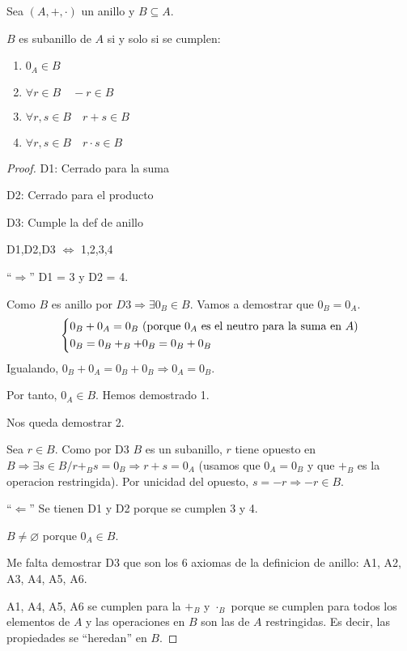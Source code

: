 \begin{proposition}
	Sea \((A,+,\cdot )\) un anillo y \(B \subseteq A \).
	
	\(B \) es subanillo de \(A \) si y solo si se cumplen:
	\begin{enumerate}
		\item \(0_A \in B \)
		\item \(\forall r \in B \quad -r \in B \)
		\item \(\forall r,s \in B \quad r + s \in B \)
		\item \(\forall r,s \in B \quad r \cdot s \in B \)
	\end{enumerate}
\end{proposition}
\begin{proof}
	D1: Cerrado para la suma
	
	D2: Cerrado para el producto
	
	D3: Cumple la def de anillo
	
	D1,D2,D3 \(\iff\) 1,2,3,4
	
	``\(\Rightarrow \)'' D1 = 3 y D2 = 4.
	
	Como \(B \) es anillo por \(D3 \Rightarrow \exists 0_B \in B \). Vamos a demostrar que \(0_B = 0_A \).
	\[
		\begin{dcases}
			0_B + 0_A = 0_B \text{ (porque } 0_A \text{ es el neutro para la suma en } A) \\
			0_B = 0_B +_B + 0_B = 0_B + 0_B
		\end{dcases}
	\]
	Igualando, \(0_B + 0_A = 0_B + 0_B \Rightarrow 0_A = 0_B \).
	
	Por tanto, \(0_A \in B \). Hemos demostrado 1.
	
	Nos queda demostrar 2.
	
	Sea \(r \in B \). Como por D3 \(B \) es un subanillo, \(r \) tiene opuesto en \(B \Rightarrow \exists s \in B / r +_B s = 0_B \Rightarrow r + s = 0_A\) (usamos que \(0_A = 0_B\) y que \(+_B\) es la operacion restringida). Por unicidad del opuesto, \(s = -r \Rightarrow -r \in B\).
	
	``\(\Leftarrow \)'' Se tienen D1 y D2 porque se cumplen 3 y 4.
	
	\(B \neq \varnothing\) porque \(0_A \in B \).
	
	Me falta demostrar D3 que son los 6 axiomas de la definicion de anillo: A1, A2, A3, A4, A5, A6.
	
	A1, A4, A5, A6 se cumplen para la \(+_B \) y \(\cdot_B \) porque se cumplen para todos los elementos de \(A \) y las operaciones en \(B \) son las de \(A \) restringidas. Es decir, las propiedades se ``heredan'' en \(B \).
	

\end{proof}
